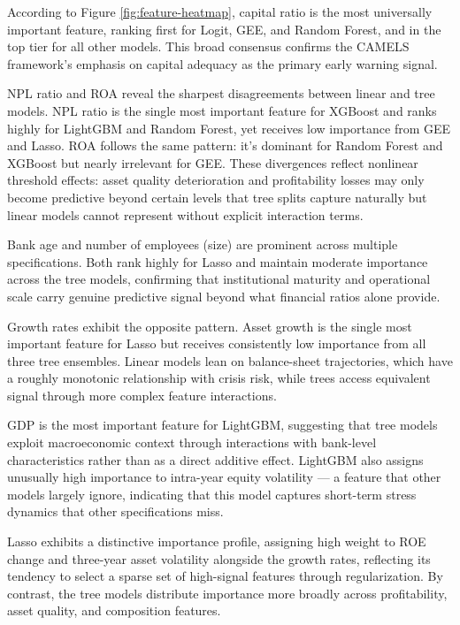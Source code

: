 \documentclass[conference]{IEEEtran}
\begin{document}
According to Figure \ref{fig:feature-heatmap}, capital ratio is the most universally important feature, ranking first for Logit, GEE, and Random Forest, and in the top tier for all other models. This broad consensus confirms the CAMELS framework's emphasis on capital adequacy as the primary early warning signal.

NPL ratio and ROA reveal the sharpest disagreements between linear and tree models. NPL ratio is the single most important feature for XGBoost and ranks highly for LightGBM and Random Forest, yet receives low importance from GEE and Lasso. ROA follows the same pattern: it's dominant for Random Forest and XGBoost but nearly irrelevant for GEE. These divergences reflect nonlinear threshold effects: asset quality deterioration and profitability losses may only become predictive beyond certain levels that tree splits capture naturally but linear models cannot represent without explicit interaction terms.

Bank age and number of employees (size) are prominent across multiple specifications. Both rank highly for Lasso and maintain moderate importance across the tree models, confirming that institutional maturity and operational scale carry genuine predictive signal beyond what financial ratios alone provide.

Growth rates exhibit the opposite pattern. Asset growth is the single most important feature for Lasso but receives consistently low importance from all three tree ensembles. Linear models lean on balance-sheet trajectories, which have a roughly monotonic relationship with crisis risk, while trees access equivalent signal through more complex feature interactions.

GDP is the most important feature for LightGBM, suggesting that tree models exploit macroeconomic context through interactions with bank-level characteristics rather than as a direct additive effect. LightGBM also assigns unusually high importance to intra-year equity volatility — a feature that other models largely ignore, indicating that this model captures short-term stress dynamics that other specifications miss.

Lasso exhibits a distinctive importance profile, assigning high weight to ROE change and three-year asset volatility alongside the growth rates, reflecting its tendency to select a sparse set of high-signal features through regularization. By contrast, the tree models distribute importance more broadly across profitability, asset quality, and composition features.
\end{document}
